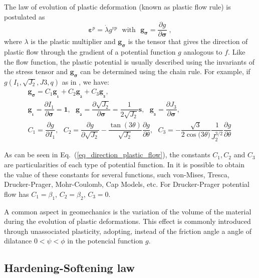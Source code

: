 \documentclass[Journal,letterpaper]{ascelike-new}
\newcommand{\strainp}{\boldsymbol{\varepsilon}^{p}}
\newcommand{\sll}{\boldsymbol{s}}
\newcommand{\onell}{\boldsymbol{1}}
\newcommand{\dgds}{\boldsymbol{g_\sigma}}
\newcommand{\gllum}{\boldsymbol {g_{_1}}}
\newcommand{\glldois}{\boldsymbol {g_{_2}}}
\newcommand{\glltres}{\boldsymbol {g_{_3}}}
\newcommand{\gvp}{g^{vp}}
\newcommand{\stress}{\boldsymbol{\sigma}}
\begin{document}
The law of evolution of plastic deformation (known as plastic flow rule) is postulated as
\begin{equation} \label{eq_plastic_flow}
	\strainp = \dot \lambda \gvp ~~~ \text{with} ~~~ \dgds = \dfrac{\partial g}{\partial \stress} \;,
\end{equation}
where $\lambda$ is the plastic multiplier and $\dgds$ is the tensor that gives the direction of plastic flow through the gradient of a potential function $g$ analogous to $f$. Like the flow function, the plastic potential is usually described using the invariants of the stress tensor and $\dgds$ can be determined using the chain rule. For example, if $g(I_1,\sqrt{J_2},J3,q)$ as in , we have:
\begin{equation} \label{eq_direction_plastic_flow}
	\begin{array}{lcl}
	\dgds = C_1\gllum + C_2\glldois + C_3\glltres, \\ 
	\gllum = \dfrac{\partial I_1}{\partial \stress} = \onell,~~~ \glldois = \dfrac{\partial \sqrt{J_2}}{\partial \stress} = \dfrac{1}{2\sqrt{J_2}}\sll,~~~ \glltres = \dfrac{\partial J_3}{\partial \stress}, \\
	C_1 = \dfrac{\partial g}{\partial I_1},~~~C_2=\dfrac{\partial g}{\partial \sqrt{J_2}}-\dfrac{\tan{(3\theta)}}{\sqrt{J_2}}\dfrac{\partial g}{\partial \theta},~~~C_3 = -\dfrac{\sqrt{3}}{2\cos{(3\theta})}\dfrac{1}{J_2^{3/2}}\dfrac{\partial g}{\partial \theta} \,
\end{array}
\end{equation}

As can be seen in Eq.~(\ref{eq_direction_plastic_flow}), the constants $C_1, C_2$ and $C_3$ are particularities of each type of potential function. In  it is possible to obtain the value of these constants for several functions, such von-Mises, Tresca, Drucker-Prager, Mohr-Coulomb, Cap Models, etc. For Drucker-Prager potential flow has $C_1 = \beta_1$, $C_2 = \beta_2$, $C_3 = 0$.

A common aspect in geomechanics is the variation of the volume of the material during the evolution of plastic deformations. This effect is commonly introduced through unassociated plasticity, adopting, instead of the friction angle a angle of dilatance $0<\psi<\phi$ in the potencial function $g$.

\subsection{Hardening-Softening law}
\end{document}
